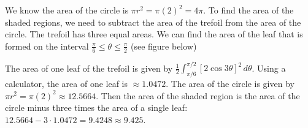 \begin{Answer}[ref = polar2]
We know the area of the circle is $\pi r^2 = \pi(2)^2 = 4\pi$. To find the 
area of the shaded regions, we need to subtract the area of the trefoil from 
the area of the circle. The trefoil has three equal areas. We can find the 
area of the leaf that is formed on the interval $\frac{\pi}{6} \leq \theta 
\leq \frac{\pi}{2}$ (see figure below)

\begin{center}
\end{center}

The area of one leaf of the trefoil is given by $\frac{1}{2} \int_{\pi/6}^{
\pi/2} \left[2\cos{3\theta} \right]^2\,d\theta$. Using a calculator, the area 
of one leaf is $\approx 1.0472$. The area of the circle is given by $\pi r^2 = 
\pi (2)^2 \approx 12.5664$. Then the area of the shaded region is the area of 
the circle minus three times the area of a single leaf: $12.5664 - 3 \cdot 
1.0472 = 9.4248 \approx 9.425$. 
\end{Answer}